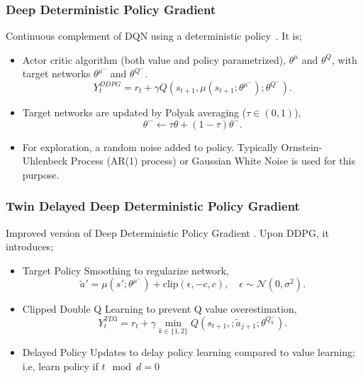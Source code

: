 \documentclass{beamer}
\begin{document}
\begin{frame}
\frametitle{Deep Deterministic Policy Gradient}
Continuous complement of DQN using a deterministic policy~\cite{lillicrap_continuous_2019}. It is;
\begin{itemize}
	\item Actor critic algorithm (both value and policy parametrized), $\theta^{\mu}$ and $\theta^{Q}$, with target networks $\theta^{\mu^-}$ and $\theta^{Q^-}$. 
	\begin{equation}
	\label{eqn:ddpg_target}
	Y_t^{DDPG} = r_t + \gamma Q(s_{t+1}, \mu(s_{t+1};\theta^{\mu^-});\theta^{Q^-}).
	\end{equation}
	\item Target networks are updated by Polyak averaging ($\tau \in (0,1)$),
	\begin{equation}
	\label{eqn:target_update}
	\theta^- \leftarrow \tau \theta + (1-\tau) \theta^- .
	\end{equation}
	\item For exploration, a random noise added to policy. Typically Ornstein-Uhlenbeck Process (AR(1) process) \cite{uhlenbeck_theory_1930} or Gaussian White Noise is used for this purpose.
\end{itemize}
\end{frame}


\begin{frame}
\frametitle{Twin Delayed Deep Deterministic Policy Gradient}
Improved version of Deep Deterministic Policy Gradient \cite{fujimoto_addressing_2018}.
Upon DDPG, it introduces;
\begin{itemize}
	\item Target Policy Smoothing to regularize network,
	\begin{equation}
	\label{eqn:td3_target_action}
	\widetilde{a}' = \mu(s';\theta^{\mu^-}) + \text{clip}(\epsilon, -c, c), \quad \epsilon \sim \mathcal{N}(0, \sigma^2).
	\end{equation}
	\item Clipped Double Q Learning to prevent Q value overestimation,
	\begin{equation}
	\label{eqn:td3_target}
	Y_t^{TD3} = r_t + \gamma \min_{k\in\{1,2\}} Q(s_{t+1}, ;\widetilde{a}_{j+1};\theta^{Q_k^-}).
	\end{equation}
	\item Delayed Policy Updates to delay policy learning compared to value learning; i.e, learn policy if $t\mod d = 0$
\end{itemize}
\end{frame}
\end{document}
